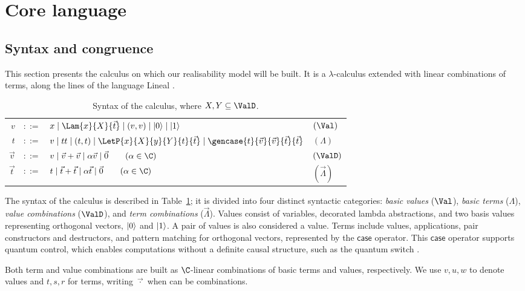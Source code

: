 \section{Core language}\label{sec:calculus}
\subsection{Syntax and congruence}
This section presents the calculus on which our realisability model will be
built. It is a $\lambda$-calculus extended with linear combinations of terms,
along the lines of the language Lineal \cite{ArrighiDowekLMCS17}.

\begin{table}[t]
  \centering
  \begin{tabular}{rcll}
    $v$ & $::=$ & $x \mid \Lam{x}{X}{\vec{t}} \mid (v, v) \mid \ket{0} \mid \ket{1}$ & $(\Val)$ \\
    $t$ & $::=$ & $v \mid tt \mid (t,t) \mid \LetP{x}{X}{y}{Y}{t}{\vec{t}} \mid \gencase{t}{\vec{v}}{\vec{v}}{\vec{t}}{\vec{t}}$ & $(\Lambda)$ \\
    $\vec{v}$ & $::=$ & $v \mid \vec{v}+\vec{v} \mid \alpha \vec{v} \mid \vec 0 \qquad (\alpha\in\C)$ & $(\ValD)$ \\
    $\vec{t}$ & $::=$ & $t \mid \vec{t}+\vec{t} \mid \alpha \vec{t} \mid \vec 0 \qquad (\alpha\in\C)$ & $(\vec \Lambda)$
  \end{tabular}
  \caption{Syntax of the calculus, where $X, Y \subseteq \ValD$.}
  \label{tab:Syntax}
\end{table}
The syntax of the calculus is described in
Table~\ref{tab:Syntax}; it is divided into four
distinct syntactic categories: \emph{basic values} ($\Val$), \emph{basic terms}
($\Lambda$), \emph{value combinations} ($\ValD$), and \emph{term
combinations} ($\vec\Lambda$). Values consist of variables, decorated
lambda abstractions, and two basis values representing orthogonal vectors,
$\left\vert{0}\right\rangle$ and $\left\vert{1}\right\rangle$. A pair of values is also considered a value.  Terms
include values, applications, pair constructors and destructors, and pattern
matching for orthogonal vectors, represented by the $\mathsf{case}$ operator.
This $\mathsf{case}$ operator supports quantum control, which enables
computations without a definite causal structure, such as the quantum switch 
\cite{Chiribella_2013}.

Both term and value combinations are built as $\C$-linear combinations of
basic terms and values, respectively. We use $v,u,w$ to denote values and
$t,s,r$ for terms, writing $\vec{\cdot}$ when can be combinations.


